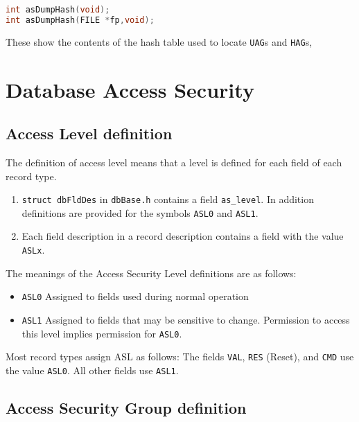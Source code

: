 \begin{lstlisting}[language=C]
int asDumpHash(void);
int asDumpHash(FILE *fp,void);
\end{lstlisting}

These show the contents of the hash table used to locate \verb|UAG|s and \verb|HAG|s,

\section{Database Access Security}

\subsection{Access Level definition}

The definition of access level means that a level is defined for each field of each record type.

\begin{enumerate}
\item \verb|struct dbFldDes| in \verb|dbBase.h| contains a field \verb|as_level|.
In addition definitions are provided for the symbols \verb|ASL0| and \verb|ASL1|.

\item Each field description in a record description contains a field with the value \verb|ASLx|.
\end{enumerate}

The meanings of the Access Security Level definitions are as follows:

\begin{itemize}
\item \verb|ASL0| Assigned to fields used during normal operation

\item \verb|ASL1| Assigned to fields that may be sensitive to change.
Permission to access this level implies permission for \verb|ASL0|.
\end{itemize}

Most record types assign ASL as follows:
The fields \verb|VAL|, \verb|RES| (Reset), and \verb|CMD| use the value \verb|ASL0|.
All other fields use \verb|ASL1|.

\subsection{Access Security Group definition}

